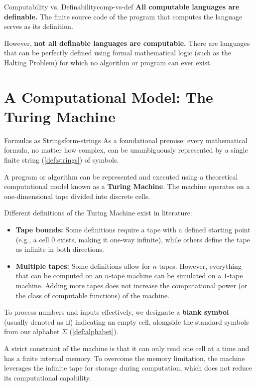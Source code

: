 \begin{observation}{Computability vs. Definability}{comp-vs-def}
    \textbf{All computable languages are definable.} The finite source code of the program that computes the language serves as its definition. 
    
    However, \textbf{not all definable languages are computable.} There are languages that can be perfectly defined using formal mathematical logic (such as the Halting Problem) for which no algorithm or program can ever exist.
\end{observation}

\section{A Computational Model: The Turing Machine}

\begin{observation}{Formulas as Strings}{form-strings}
    As a foundational premise: every mathematical formula, no matter how complex, can be unambiguously represented by a single finite string (\cref{def:strings}) of symbols.
\end{observation}

\noindent A program or algorithm can be represented and executed using a theoretical computational model known as a \textbf{Turing Machine}. The machine operates on a one-dimensional tape divided into discrete cells. 

Different definitions of the Turing Machine exist in literature:
\begin{itemize}
    \item \textbf{Tape bounds:} Some definitions require a tape with a defined starting point (e.g., a cell \(0\) exists, making it one-way infinite), while others define the tape as infinite in both directions.
    \item \textbf{Multiple tapes:} Some definitions allow for \(n\)-tapes. However, everything that can be computed on an \(n\)-tape machine can be simulated on a \(1\)-tape machine. Adding more tapes does not increase the computational power (or the class of computable functions) of the machine.
\end{itemize}

\noindent To process numbers and inputs effectively, we designate a \textbf{blank symbol} (usually denoted as \(\sqcup\)) indicating an empty cell, alongside the standard symbols from our alphabet \(\Sigma\) (\cref{def:alphabet}). 

A strict constraint of the machine is that it can only read one cell at a time and has a finite internal memory. To overcome the memory limitation, the machine leverages the infinite tape for storage during computation, which does not reduce its computational capability.

